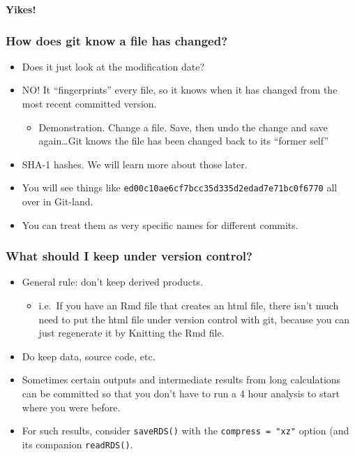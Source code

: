 \documentclass[]{book}
\providecommand{\tightlist}{%
  \setlength{\itemsep}{0pt}\setlength{\parskip}{0pt}}
\theoremstyle{definition}
\theoremstyle{definition}
\theoremstyle{remark}
\begin{document}
\textbf{Yikes!}

\subsubsection{How does git know a file has
changed?}\label{how-does-git-know-a-file-has-changed}

\begin{itemize}
\tightlist
\item
  Does it just look at the modification date?
\item
  NO! It ``fingerprints'' every file, so it knows when it has changed
  from the most recent committed version.

  \begin{itemize}
  \tightlist
  \item
    Demonstration. Change a file. Save, then undo the change and save
    again\ldots{}Git knows the file has been changed back to its
    ``former self''
  \end{itemize}
\item
  SHA-1 hashes. We will learn more about those later.\\
\item
  You will see things like
  \texttt{ed00c10ae6cf7bcc35d335d2edad7e71bc0f6770} all over in
  Git-land.
\item
  You can treat them as very specific names for different commits.
\end{itemize}

\subsubsection{What should I keep under version
control?}\label{what-should-i-keep-under-version-control}

\begin{itemize}
\tightlist
\item
  General rule: don't keep derived products.

  \begin{itemize}
  \tightlist
  \item
    i.e.~If you have an Rmd file that creates an html file, there isn't
    much need to put the html file under version control with git,
    because you can just regenerate it by Knitting the Rmd file.
  \end{itemize}
\item
  Do keep data, source code, etc.
\item
  Sometimes certain outputs and intermediate results from long
  calculations can be committed so that you don't have to run a 4 hour
  analysis to start where you were before.
\item
  For such results, consider \texttt{saveRDS()} with the
  \texttt{compress\ =\ "xz"} option (and its companion
  \texttt{readRDS()}.
\end{itemize}
\end{document}
